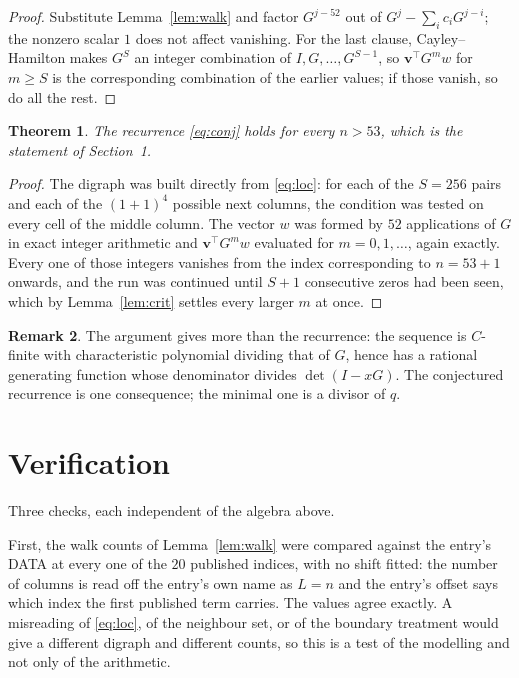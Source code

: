 \documentclass[11pt,a4paper]{article}
\theoremstyle{plain}
\newtheorem{theorem}{Theorem}
\theoremstyle{definition}
\newtheorem{remark}[theorem]{Remark}
\begin{document}
\begin{proof}
Substitute Lemma~\ref{lem:walk} and factor $G^{j-52}$ out of
$G^{j}-\sum_ic_iG^{j-i}$; the nonzero scalar $1$ does not affect
vanishing. For the last clause, Cayley--Hamilton makes $G^{S}$ an integer combination of
$I,G,\dots,G^{S-1}$, so $\mathbf{v}^{\!\top}G^{m}w$ for $m\ge S$ is the corresponding
combination of the earlier values; if those vanish, so do all the rest.
\end{proof}

\begin{theorem}
The recurrence \eqref{eq:conj} holds for every $n>53$, which is the statement of
Section~1.
\end{theorem}

\begin{proof}
The digraph was built directly from \eqref{eq:loc}: for each of the $S=256$ pairs and each
of the $(1+1)^{4}$ possible next columns, the condition was tested on every cell of
the middle column. The vector $w$ was formed by $52$ applications of $G$ in exact integer
arithmetic and $\mathbf{v}^{\!\top}G^{m}w$ evaluated for $m=0,1,\dots$, again exactly.
Every one of those integers vanishes from the index corresponding to $n=53+1$ onwards,
and the run was continued until $S+1$ consecutive zeros had been seen, which by
Lemma~\ref{lem:crit} settles every larger $m$ at once.
\end{proof}

\begin{remark}
The argument gives more than the recurrence: the sequence is $C$-finite with characteristic
polynomial dividing that of $G$, hence has a rational generating function whose denominator
divides $\det(I-xG)$. The conjectured recurrence is one consequence; the minimal one is a
divisor of $q$.
\end{remark}

\section{Verification}

Three checks, each independent of the algebra above.

First, the walk counts of Lemma~\ref{lem:walk} were compared against the entry's DATA at
every one of the $20$ published indices, with no shift fitted: the number of columns is
read off the entry's own name as $L=n$ and the entry's offset says which index the first
published term carries. The values agree exactly. A misreading of \eqref{eq:loc}, of the
neighbour set, or of the boundary treatment would give a different digraph and different
counts, so this is a test of the modelling and not only of the arithmetic.
\end{document}
